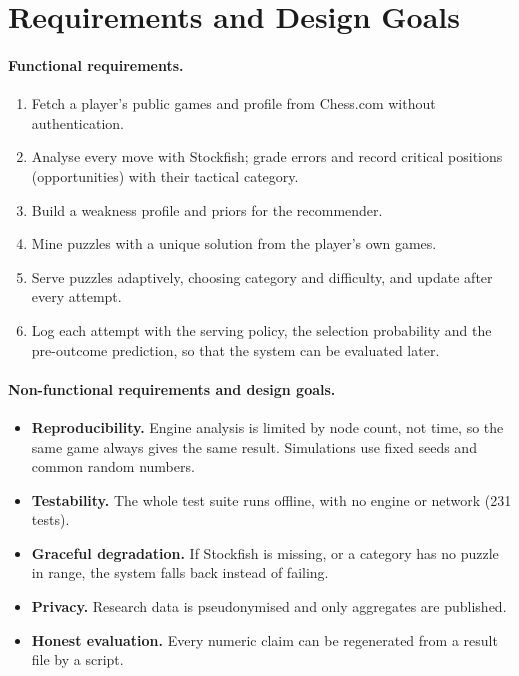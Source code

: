\section{Requirements and Design Goals}

\paragraph{Functional requirements.}
\begin{enumerate}[label=FR\arabic*]
  \item Fetch a player's public games and profile from Chess.com without authentication.
  \item Analyse every move with Stockfish; grade errors and record critical positions (opportunities)
        with their tactical category.
  \item Build a weakness profile and priors for the recommender.
  \item Mine puzzles with a unique solution from the player's own games.
  \item Serve puzzles adaptively, choosing category and difficulty, and update after every attempt.
  \item Log each attempt with the serving policy, the selection probability and the pre-outcome
        prediction, so that the system can be evaluated later.
\end{enumerate}

\paragraph{Non-functional requirements and design goals.}
\begin{itemize}
  \item \textbf{Reproducibility.} Engine analysis is limited by node count, not time, so the same game
        always gives the same result. Simulations use fixed seeds and common random numbers.
  \item \textbf{Testability.} The whole test suite runs offline, with no engine or network (231 tests).
  \item \textbf{Graceful degradation.} If Stockfish is missing, or a category has no puzzle in range,
        the system falls back instead of failing.
  \item \textbf{Privacy.} Research data is pseudonymised and only aggregates are published.
  \item \textbf{Honest evaluation.} Every numeric claim can be regenerated from a result file by a
        script.
\end{itemize}


